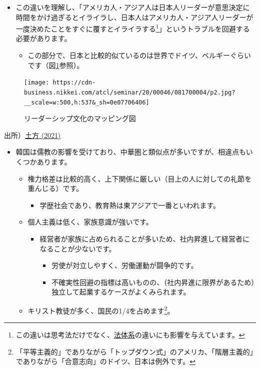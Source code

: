 \documentclass[
]{book}
\providecommand{\tightlist}{%
  \setlength{\itemsep}{0pt}\setlength{\parskip}{0pt}}
\begin{document}
\begin{itemize}
\item
  この違いを理解し、「アメリカ人・アジア人は日本人リーダーが意思決定に時間をかけ過ぎるとイライラし、日本人はアメリカ人・アジア人リーダーが一度決めたことをすぐに覆すとイライラする\footnote{この違いは思考法だけでなく、\protect\hyperlink{law}{法体系}の違いにも影響を与えています。}」というトラブルを回避する必要があります。

  \begin{itemize}
  \tightlist
  \item
    この部分で、日本と比較的似ているのは世界でドイツ、ベルギーぐらいです（図\ref{fig:leadership}参照）。
  \end{itemize}
\end{itemize}

\begin{figure}
\texttt{[image: https://cdn-business.nikkei.com/atcl/seminar/20/00046/081700004/p2.jpg?\_\_scale=w:500,h:537\&\_sh=0e07706406]} \caption{リーダーシップ文化のマッピング図}\label{fig:leadership}
\end{figure}

出所）\href{https://business.nikkei.com/atcl/seminar/20/00046/081700004/?n_cid=nbpnb_twed}{土方 (2021)}

\begin{itemize}
\item
  韓国は儒教の影響を受けており、中華圏と類似点が多いですが、相違点もいくつかあります。

  \begin{itemize}
  \item
    権力格差は比較的高く、上下関係に厳しい（目上の人に対しての礼節を重んじる）です。

    \begin{itemize}
    \tightlist
    \item
      学歴社会であり、教育熱は東アジアで一番といわれます。
    \end{itemize}
  \item
    個人主義は低く、家族意識が強いです。

    \begin{itemize}
    \item
      経営者が家族に占められることが多いため、社内昇進して経営者になることが少ないです。

      \begin{itemize}
      \item
        労使が対立しやすく、労働運動が闘争的です。
      \item
        不確実性回避の指標は高いものの、（社内昇進に限界があるため）独立して起業するケースがよくみられます。
      \end{itemize}
    \end{itemize}
  \item
    キリスト教徒が多く、国民の1/4を占めます\footnote{「平等主義的」でありながら「トップダウン式」のアメリカ、「階層主義的」でありながら「合意志向」のドイツ、日本は例外です。}。
  \end{itemize}
\end{itemize}
\end{document}
